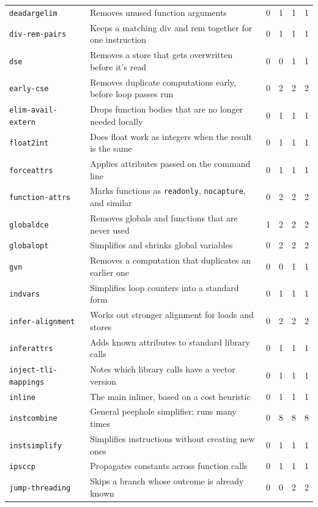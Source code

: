 \documentclass[11pt,a4paper]{article}
\begin{document}
{\begin{longtable}{lp{6.4cm}rrrr}
\texttt{deadargelim} & Removes unused function arguments & 0 & 1 & 1 & 1 \\
\texttt{div-rem-pairs} & Keeps a matching div and rem together for one instruction & 0 & 1 & 1 & 1 \\
\texttt{dse} & Removes a store that gets overwritten before it's read & 0 & 0 & 1 & 1 \\
\texttt{early-cse} & Removes duplicate computations early, before loop passes run & 0 & 2 & 2 & 2 \\
\texttt{elim-avail-extern} & Drops function bodies that are no longer needed locally & 0 & 1 & 1 & 1 \\
\texttt{float2int} & Does float work as integers when the result is the same & 0 & 1 & 1 & 1 \\
\texttt{forceattrs} & Applies attributes passed on the command line & 0 & 1 & 1 & 1 \\
\texttt{function-attrs} & Marks functions as \texttt{readonly}, \texttt{nocapture}, and similar & 0 & 2 & 2 & 2 \\
\texttt{globaldce} & Removes globals and functions that are never used & 1 & 2 & 2 & 2 \\
\texttt{globalopt} & Simplifies and shrinks global variables & 0 & 2 & 2 & 2 \\
\texttt{gvn} & Removes a computation that duplicates an earlier one & 0 & 0 & 1 & 1 \\
\texttt{indvars} & Simplifies loop counters into a standard form & 0 & 1 & 1 & 1 \\
\texttt{infer-alignment} & Works out stronger alignment for loads and stores & 0 & 2 & 2 & 2 \\
\texttt{inferattrs} & Adds known attributes to standard library calls & 0 & 1 & 1 & 1 \\
\texttt{inject-tli-mappings} & Notes which library calls have a vector version & 0 & 1 & 1 & 1 \\
\texttt{inline} & The main inliner, based on a cost heuristic & 0 & 1 & 1 & 1 \\
\texttt{instcombine} & General peephole simplifier; runs many times & 0 & 8 & 8 & 8 \\
\texttt{instsimplify} & Simplifies instructions without creating new ones & 0 & 1 & 1 & 1 \\
\texttt{ipsccp} & Propagates constants across function calls & 0 & 1 & 1 & 1 \\
\texttt{jump-threading} & Skips a branch whose outcome is already known & 0 & 0 & 2 & 2 \\

\end{longtable}}
\end{document}
